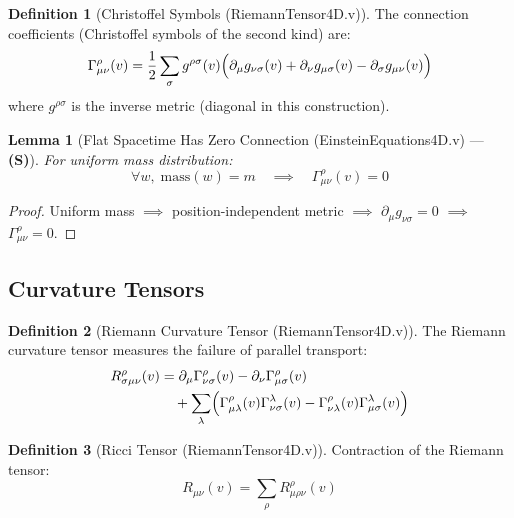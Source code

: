 \documentclass[11pt, a4paper]{report}
\theoremstyle{definition}
\newtheorem{definition}{Definition}[chapter]
\theoremstyle{plain}
\newtheorem{lemma}[theorem]{Lemma}
\begin{document}
\begin{definition}[Christoffel Symbols {\normalfont (RiemannTensor4D.v)}]
The connection coefficients (Christoffel symbols of the second kind) are:
\begin{equation}
\Gamma^\rho_{\mu\nu}(v) = \frac{1}{2} \sum_\sigma g^{\rho\sigma}(v) \Bigl(\partial_\mu g_{\nu\sigma}(v) + \partial_\nu g_{\mu\sigma}(v) - \partial_\sigma g_{\mu\nu}(v)\Bigr)
\end{equation}
where $g^{\rho\sigma}$ is the inverse metric (diagonal in this construction).
\end{definition}

\begin{lemma}[Flat Spacetime Has Zero Connection {\normalfont (EinsteinEquations4D.v)} --- \textbf{(S)}]
For uniform mass distribution:
\begin{equation}
\forall w,\; \text{mass}(w) = m \quad \implies \quad \Gamma^\rho_{\mu\nu}(v) = 0
\end{equation}
\end{lemma}

\begin{proof}
Uniform mass $\implies$ position-independent metric $\implies$ $\partial_\mu g_{\nu\sigma} = 0$ $\implies$ $\Gamma^\rho_{\mu\nu} = 0$.
\end{proof}

\subsection{Curvature Tensors}

\begin{definition}[Riemann Curvature Tensor {\normalfont (RiemannTensor4D.v)}]
The Riemann curvature tensor measures the failure of parallel transport:
\begin{align}
R^\rho_{\sigma\mu\nu}(v) &= \partial_\mu \Gamma^\rho_{\nu\sigma}(v) - \partial_\nu \Gamma^\rho_{\mu\sigma}(v) \nonumber \\
&\quad + \sum_\lambda \Bigl(\Gamma^\rho_{\mu\lambda}(v)\Gamma^\lambda_{\nu\sigma}(v) - \Gamma^\rho_{\nu\lambda}(v)\Gamma^\lambda_{\mu\sigma}(v)\Bigr)
\end{align}
\end{definition}

\begin{definition}[Ricci Tensor {\normalfont (RiemannTensor4D.v)}]
Contraction of the Riemann tensor:
\begin{equation}
R_{\mu\nu}(v) = \sum_\rho R^\rho_{\mu\rho\nu}(v)
\end{equation}
\end{definition}
\end{document}
